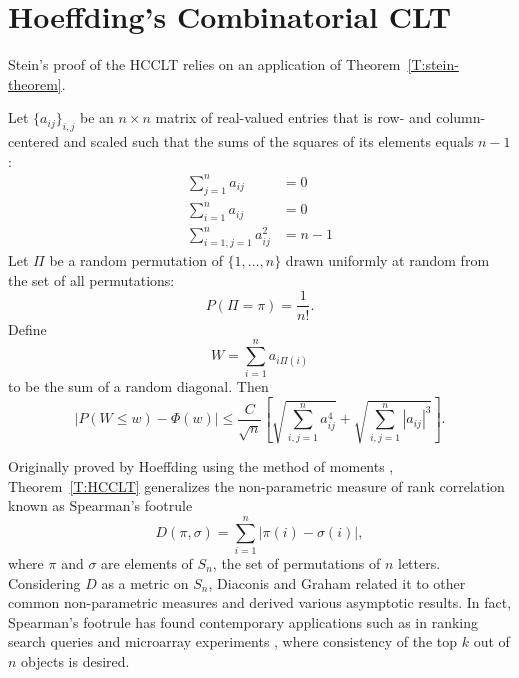 \section{Hoeffding's Combinatorial CLT}
Stein's proof of the HCCLT relies on an application of Theorem~\ref{T:stein-theorem}.
\begin{theorem}\label{T:HCCLT}
  Let $\{a_{ij}\}_{i,j}$ be an $n \times n$ matrix of real-valued
  entries that is row- and column-centered and scaled such that the sums
  of the squares of its elements equals $n-1$:
  \begin{align*}
    \sum_{j=1}^n a_{ij} &= 0 \\
    \sum_{i=1}^n a_{ij} &= 0 \\
    \sum_{i=1, j=1}^n a_{ij}^2 &= n-1
  \end{align*}
  Let $\Pi$ be a random permutation of $\{1, \ldots, n\}$ drawn
  uniformly at random from the set of all permutations:
  \begin{equation*}
    P(\Pi = \pi) = \frac{1}{n!}.
  \end{equation*}
  Define
  \begin{equation*}
    W = \sum_{i=1}^n a_{i\Pi(i)}
  \end{equation*}
  to be the sum of a random diagonal.  Then
  \begin{equation*}
    |P(W \leq w) - \Phi(w)| \leq
    \frac{C}{\sqrt{n}} \left [
      \sqrt{\sum_{i, j = 1}^{n} a_{ij}^4} +
      \sqrt{\sum_{i, j = 1}^{n} |a_{ij}|^3}
    \right ].
  \end{equation*}
\end{theorem}

Originally proved by Hoeffding using the method of moments
\cite{hoeffding1951combinatorial}, Theorem~\ref{T:HCCLT} generalizes
the non-parametric measure of rank correlation known as Spearman's
footrule \cite{spearman1904proof} \cite{salama1990note}
\begin{equation*}
  D(\pi, \sigma) = \sum_{i=1}^n |\pi(i) - \sigma(i)|,
\end{equation*}
where $\pi$ and $\sigma$ are elements of $S_n$, the set of
permutations of $n$ letters.  Considering $D$ as a metric on $S_n$,
Diaconis and Graham \cite{diaconis1977spearman} related it to other
common non-parametric measures and derived various asymptotic results.
In fact, Spearman's footrule has found contemporary applications such
as in ranking search queries and microarray experiments
\cite{sens2011spearman}, where consistency of the top $k$ out of $n$
objects is desired.

